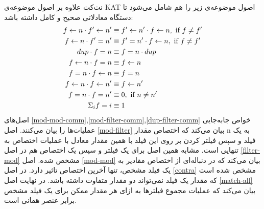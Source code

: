 نت‌کت علاوه بر اصول موضوعه‌ی
KAT
اصول‌ موضوعه‌ی زیر را هم شامل می‌شود تا دستگاه معادلاتی صحیح و کامل
داشته باشد:
\begin{align}
    f \leftarrow n \cdot f' \leftarrow n' & \equiv f' \leftarrow n' \cdot f \leftarrow n,
    \text{ if } f \neq f' \label{mod-mod-comm}
    \\
    f \leftarrow n \cdot f' = n'   & \equiv f' = n' \cdot f \leftarrow n,
    \text{ if } f \neq f' \label{mod-filter-comm}                            \\
    dup \cdot f = n         & \equiv f = n \cdot dup \label{dup-filter-comm} \\
    f \leftarrow n \cdot f = n     & \equiv f \leftarrow n \label{mod-filter}              \\
    f = n \cdot f \leftarrow n     & \equiv f = n \label{filter-mod}                \\
    f \leftarrow n \cdot f \leftarrow n'  & \equiv f \leftarrow n' \label{mod-mod}                \\
    f = n \cdot f = n'      & \equiv 0, \text{ if } n \neq n' \label{contra} \\
    \Sigma_{i} f = i        & \equiv 1 \label{match-all}
\end{align}
اصل‌های
\ref{mod-mod-comm},\ref{mod-filter-comm},\ref{dup-filter-comm}
خواص جابه‌جایی
عملیات‌ها را بیان می‌کنند.
اصل
\ref{mod-filter}
بیان می‌کند که اختصاص مقدار
n
به یک فیلد و سپس  فیلتر کردن بر روی این فیلد با همین مقدار معادل با عملیات اختصاص
به تنهایی است.
مشابه همین اصل برای یک فیلتر و سپس یک اختصاص هم در اصل
\ref{filter-mod}
مشخص شده.
اصل
\ref{mod-mod}
بیان می‌کند که در دنباله‌ای از اختصاص مقادیر به یک فیلد مشخص، تنها آخرین اختصاص تاثیر دارد.
در اصل
\ref{contra}
مشخص شده است که مقدار یک فیلد نمی‌تواند دو مقدار متفاوت داشته باشد.
در نهایت اصل
\ref{match-all}
بیان می‌کند که عملیات مجموع فیلتر‌ها به ازای هر مقدار ممکن برای یک فیلد مشخص برابر عنصر همانی
است.

